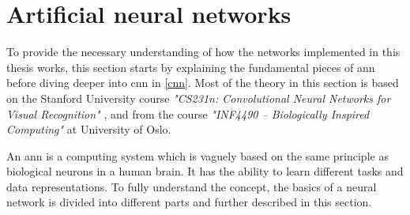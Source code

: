 \documentclass[USenglish]{ifimaster}  %
\begin{document}
\section{Artificial neural networks}
To provide the necessary understanding of how the networks implemented in this thesis works, this section starts by explaining the fundamental pieces of \ac{ann} before diving deeper into \ac{cnn} in \cref{cnn}. Most of the theory in this section is based on the Stanford University course \textit{"CS231n: Convolutional Neural Networks for Visual Recognition"} \cite{website:cs231n}, and from the course \textit{"INF4490 – Biologically Inspired Computing"} \cite{website:inf_4490_slp}\cite{website:inf_4490_mlp} at University of Oslo.

An \ac{ann} is a computing system which is vaguely based on the same principle as biological neurons in a human brain. It has the ability to learn different tasks and data representations. To fully understand the concept, the basics of a neural network is divided into different parts and further described in this section.
\end{document}
